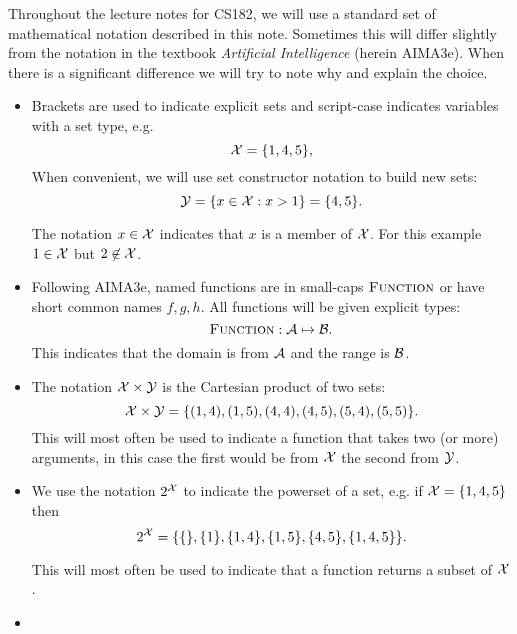 \documentclass{article}
\begin{document}
\MakeScribeTop{}


Throughout the lecture notes for CS182, we will use a standard set of
mathematical notation described in this note.  Sometimes this will
differ slightly from the notation in the textbook \textit{Artificial
  Intelligence} (herein AIMA3e). When there is a significant
difference we will try to note why and explain the choice.

\begin{itemize}
\item Brackets are used to indicate explicit sets and script-case indicates variables with a set type, e.g. \[\mathcal{X} = \{1,4, 5\}, \]
When convenient, we will use set constructor notation to build new sets:
\[\mathcal{Y} = \{ x \in \mathcal{X} : x > 1\} = \{4, 5\}.  \] 

The notation $x \in \mathcal{X}$ indicates that $x$ is a member of $\mathcal{X}$. For this example $1 \in \mathcal{X}$ but $2 \not \in \mathcal{X}$.   

\item Following AIMA3e, named functions are in small-caps $\mathrm{\textsc{Function}}$ or have short common names $f, g, h$.   All functions will be given explicit types:
  \[\mathrm{\textsc{Function}} : \mathcal{A} \mapsto \mathcal{B}.\]
  This indicates that the domain is from $\mathcal{A}$ and the range is $\mathcal{B}$.

\item The notation $\mathcal{X} \times \mathcal{Y}$ is the Cartesian product of two sets: 
  \[\mathcal{X} \times \mathcal{Y} = \{(1,4), (1,5), (4, 4), (4, 5), (5, 4), (5, 5)\}.  \] 
  This will most often be used to indicate a function that takes two
  (or more) arguments, in this case the first would be from $\mathcal{X}$ the second
  from $\mathcal{Y}$.

\item We use the notation $2^{\mathcal{X}}$ to indicate the powerset of a set, e.g. if $\mathcal{X}= \{1,4, 5\}$ then 
\[2^{\mathcal{X}} = \{\{\}, \{1\}, \{1,4\}, \{1, 5\}, \{4, 5\}, \{1,4,5\}\}.\]

This will most often be used to indicate that a function returns a subset of $\mathcal{X}$.  

\item 


\end{itemize}
\end{document}
